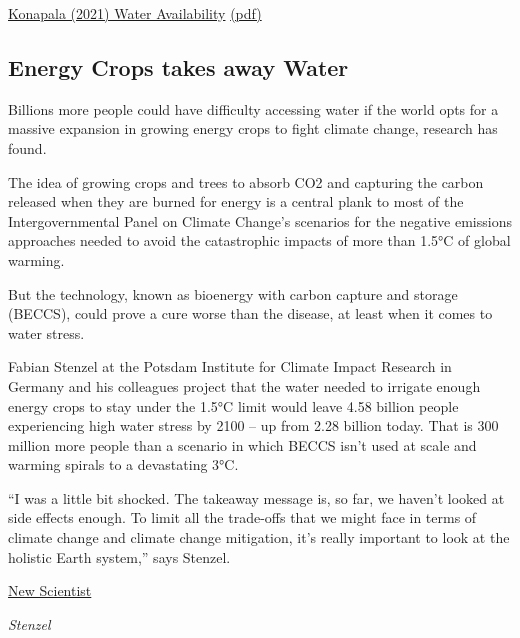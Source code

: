 \documentclass[
]{book}
\begin{document}
\href{https://www.nature.com/articles/s41467-020-16757-w}{Konapala (2021) Water Availability}
\href{pdf/Konapala_2021_Water_Availability.pdf}{(pdf)}

\hypertarget{energy-crops-takes-away-water}{%
\subsection{Energy Crops takes away Water}\label{energy-crops-takes-away-water}}

Billions more people could have difficulty accessing water if the world opts for a massive expansion in growing energy crops to fight climate change, research has found.

The idea of growing crops and trees to absorb CO2 and capturing the carbon released when they are burned for energy is a central plank to most of the Intergovernmental Panel on Climate Change's scenarios for the negative emissions approaches needed to avoid the catastrophic impacts of more than 1.5°C of global warming.

But the technology, known as bioenergy with carbon capture and storage (BECCS), could prove a cure worse than the disease, at least when it comes to water stress.

Fabian Stenzel at the Potsdam Institute for Climate Impact Research in Germany and his colleagues project that the water needed to irrigate enough energy crops to stay under the 1.5°C limit would leave 4.58 billion people experiencing high water stress by 2100 -- up from 2.28 billion today. That is 300 million more people than a scenario in which BECCS isn't used at scale and warming spirals to a devastating 3°C.

``I was a little bit shocked. The takeaway message is, so far, we haven't looked at side effects enough. To limit all the trade-offs that we might face in terms of climate change and climate change mitigation, it's really important to look at the holistic Earth system,'' says Stenzel.

\href{https://www.newscientist.com/article/2270227-carbon-negative-crops-may-mean-water-shortages-for-4-5-billion-people/\#ixzz6q2AZOybe}{New Scientist}

\emph{Stenzel}
\end{document}

